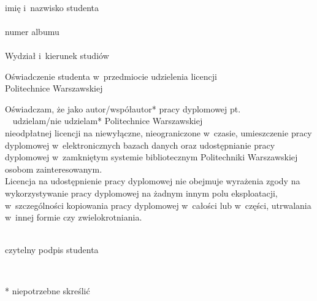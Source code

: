 \documentclass[10pt,twoside,a4paper]{article}
\begin{document}
	\vspace{5pt}
	\begin{flushleft}
		\begin{minipage}{0.33\linewidth}
			\begin{flushleft}
				\dotfill \\ \vspace{-5pt}
				imię i~nazwisko studenta \\
				\vspace{10pt}
				\dotfill \\  \vspace{-5pt}
				numer albumu \\
				\vspace{10pt}
				\dotfill \\  \vspace{-5pt}
				Wydział i~kierunek studiów
			\end{flushleft}
		\end{minipage}
	\end{flushleft}
	\vspace{15 pt}
	\begin{center}
		Oświadczenie studenta w~przedmiocie udzielenia licencji \\		
		Politechnice Warszawskiej
	\end{center}
	Oświadczam, że jako autor/współautor* pracy dyplomowej pt. \dotfill \\ $\phantom{x}$ \hspace{-15pt} \dotfill udzielam/nie udzielam* Politechnice Warszawskiej \\ nieodpłatnej licencji na niewyłączne, nieograniczone w~czasie, umieszczenie pracy dyplomowej w~elektronicznych bazach danych oraz udostępnianie pracy dyplomowej w~zamkniętym systemie bibliotecznym Politechniki Warszawskiej osobom zainteresowanym. \\	
	
	Licencja na udostępnienie pracy dyplomowej nie obejmuje wyrażenia zgody na wykorzystywanie pracy dyplomowej na żadnym innym polu eksploatacji, w~szczególności kopiowania pracy dyplomowej w~całości lub w~części, utrwalania w~innej formie czy zwielokrotniania.
	\vspace{40pt}
	\begin{flushright}
		\begin{minipage}{0.33\linewidth}
			\begin{center}
				\dotfill  \\ \vspace{-5pt}
				czytelny podpis studenta
			\end{center}
		\end{minipage}
		\begin{minipage}{0.025\linewidth}
			$\phantom{0}$
		\end{minipage}
	\end{flushright}
	\vfill
	\begin{flushleft}
		{\fontsize{10}{12}* niepotrzebne skreślić}
	\end{flushleft}
	
\end{document}
